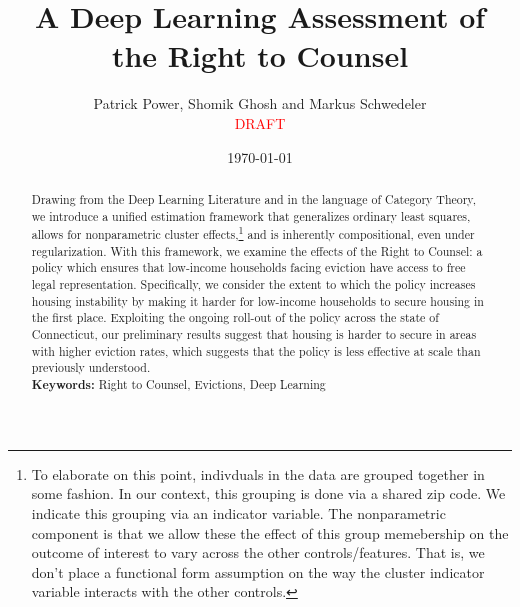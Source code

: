 \documentclass[a4paper,12pt]{article}
\begin{document}
\begin{titlepage}
\title{A Deep Learning Assessment of the Right to Counsel}

\author{Patrick Power, Shomik Ghosh and Markus Schwedeler \\ 
\textcolor{red}{DRAFT}}
\date{\today}
\maketitle
\thispagestyle{empty} %
\vspace{-2em}
\begin{abstract}
Drawing from the Deep Learning Literature and in the language of Category Theory, we introduce a unified estimation framework that generalizes ordinary least squares, allows for nonparametric cluster effects,\footnote{To elaborate on this point, indivduals in the data are grouped together in some fashion. In our context, this grouping is done via a shared zip code. We indicate this grouping via an indicator variable. The nonparametric component is that we allow these the effect of this group memebership on the outcome of interest to vary across the other controls/features. That is, we don't place a functional form assumption on the way the cluster indicator variable interacts with the other controls.} and is inherently compositional, even under regularization. With this framework, we examine the effects of the Right to Counsel: a policy which ensures that low-income households facing eviction have access to free legal representation. Specifically, we consider the extent to which the policy increases housing instability by making it harder for low-income households to secure housing in the first place. Exploiting the ongoing roll-out of the policy across the state of Connecticut, our preliminary results suggest that housing is harder to secure in areas with higher eviction rates, which suggests  that the policy is less effective at scale than previously understood. 
\vspace{0.2in}\\
\noindent\textbf{Keywords:} Right to Counsel, Evictions, Deep Learning\\
\end{abstract}
\setcounter{page}{1}
\end{titlepage}

\end{document}
